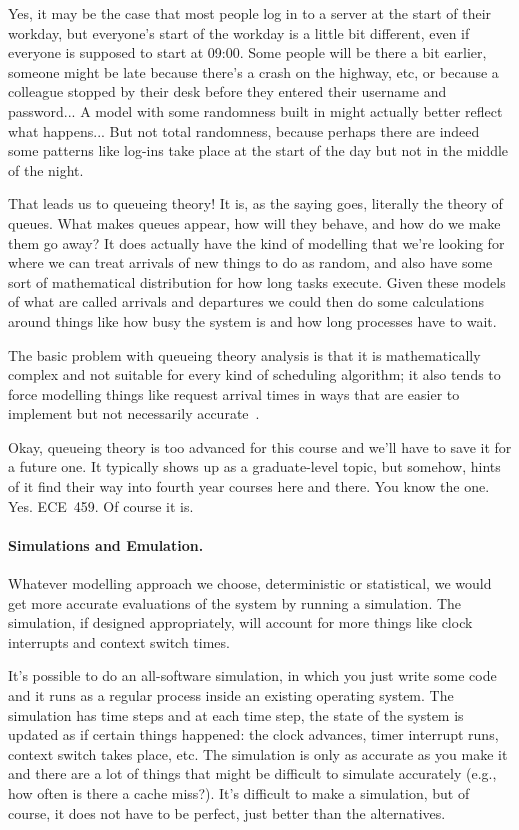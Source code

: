 Yes, it may be the case that most people log in to a server at the start of their workday, but everyone's start of the workday is a little bit different, even if everyone is supposed to start at 09:00. Some people will be there a bit earlier, someone might be late because there's a crash on the highway, etc, or because a colleague stopped by their desk before they entered their username and password...  A model with some randomness built in might actually better reflect what happens... But not total randomness, because perhaps there are indeed some patterns like log-ins take place at the start of the day but not in the middle of the night.

That leads us to queueing theory! It is, as the saying goes, literally the theory of queues. What makes queues appear, how will they behave, and how do we make them go away? It does actually have the kind of modelling that we're looking for where we can treat arrivals of new things to do as random, and also have some sort of mathematical distribution for how long tasks execute. Given these models of what are called arrivals and departures we could then do some calculations around things like how busy the system is and how long processes have to wait.

The basic problem with queueing theory analysis is that it is mathematically complex and not suitable for every kind of scheduling algorithm; it also tends to force modelling things like request arrival times in ways that are easier to implement but not necessarily accurate~\cite{osc}.

Okay, queueing theory is too advanced for this course and we'll have to save it for a future one. It typically shows up as a graduate-level topic, but somehow, hints of it find their way into fourth year courses here and there. You know the one. Yes. ECE~459. Of course it is. 

\paragraph{Simulations and Emulation.}
Whatever modelling approach we choose, deterministic or statistical, we would get more accurate evaluations of the system by running a simulation. The simulation, if designed appropriately, will account for more things like clock interrupts and context switch times.

It's possible to do an all-software simulation, in which you just write some code and it runs as a regular process inside an existing operating system. The simulation has time steps and at each time step, the state of the system is updated as if certain things happened: the clock advances, timer interrupt runs, context switch takes place, etc. The simulation is only as accurate as you make it and there are a lot of things that might be difficult to simulate accurately (e.g., how often is there a cache miss?). It's difficult to make a simulation, but of course, it does not have to be perfect, just better than the alternatives.

